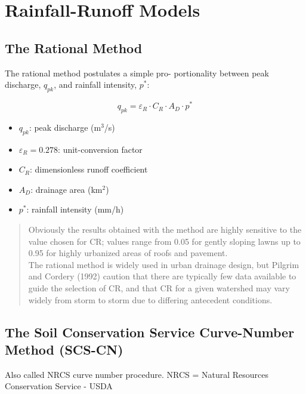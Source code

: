 \documentclass[
  letterpaper,
  DIV=11,
  numbers=noendperiod]{scrreprt}
\providecommand{\tightlist}{%
  \setlength{\itemsep}{0pt}\setlength{\parskip}{0pt}}\usepackage{longtable,booktabs,array}
\begin{document}
\hypertarget{rainfall-runoff-models}{%
\section{Rainfall-Runoff Models}\label{rainfall-runoff-models}}

\hypertarget{the-rational-method}{%
\subsection{The Rational Method}\label{the-rational-method}}

The rational method postulates a simple pro- portionality between peak
discharge, \(q_{pk}\), and rainfall intensity, \(p^*\):

\[
q_{pk} = \varepsilon_R \cdot C_R \cdot A_D \cdot p^*
\]

\begin{itemize}
\tightlist
\item
  \(q_{pk}\): peak discharge (m\(^3\)/s)
\item
  \(\varepsilon_R=0.278\): unit-conversion factor
\item
  \(C_R\): dimensionless runoff coefficient
\item
  \(A_D\): drainage area (km\(^2\))
\item
  \(p^*\): rainfall intensity (mm/h)
\end{itemize}

\begin{quote}
Obviously the results obtained with the method are highly sensitive to
the value chosen for CR; values range from 0.05 for gently sloping lawns
up to 0.95 for highly urbanized areas of roofs and pavement.\\
The rational method is widely used in urban drainage design, but Pilgrim
and Cordery (1992) caution that there are typically few data available
to guide the selection of CR, and that CR for a given watershed may vary
widely from storm to storm due to differing antecedent conditions.
\end{quote}

\hypertarget{the-soil-conservation-service-curve-number-method-scs-cn}{%
\subsection{The Soil Conservation Service Curve-Number Method
(SCS-CN)}\label{the-soil-conservation-service-curve-number-method-scs-cn}}

Also called NRCS curve number procedure. NRCS = Natural Resources
Conservation Service - USDA
\end{document}
